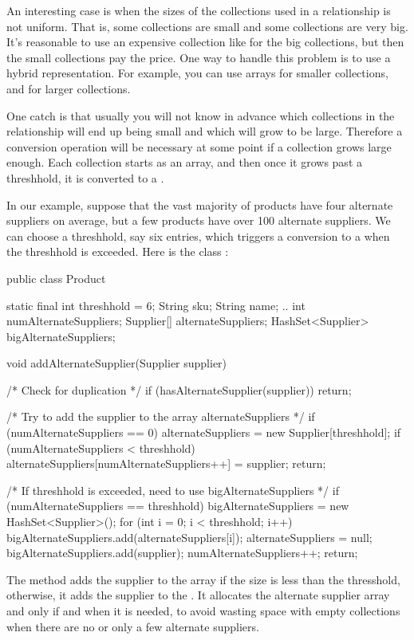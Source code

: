 An interesting case is when the sizes of the collections used in a relationship
is not uniform. That is, some collections are small and some collections are
very big.  It's reasonable to use an expensive collection like 
for the big collections, but then the small collections pay the price. One way
to handle this problem is to use a hybrid representation. For example, you can
use arrays for smaller collections, and  for larger
collections. 

One catch is that usually you will not know in advance which collections in the
relationship will end up being small and which will grow to be large. Therefore
a conversion operation will be necessary at some point if a collection grows
large enough. Each collection starts as an array, and then once it
grows past a threshhold, it is converted to a .

In our example, suppose that the vast majority of products have four alternate
suppliers on average, but a few products have over 100 alternate suppliers. We
can choose a threshhold, say six entries, which triggers a conversion to a
 when the threshhold is exceeded. Here is the class
:

\begin{shortlisting} 
public class Product {

	    static final int threshhold = 6;
		String sku;
		String name;
		..
		int numAlternateSuppliers;
		Supplier[] alternateSuppliers;
		HashSet<Supplier> bigAlternateSuppliers;
		
		void addAlternateSupplier(Supplier supplier) {
		
		    /* Check for duplication */
		    if (hasAlternateSupplier(supplier)) {
		         return;
		    }
		
		    /* Try to add the supplier to the array alternateSuppliers */
		    if (numAlternateSuppliers == 0) {
		        alternateSuppliers = new Supplier[threshhold];
		    }
			if (numAlternateSuppliers < threshhold) {
			    alternateSuppliers[numAlternateSuppliers++] = supplier;
			    return;
			}
			
			/* If threshhold is exceeded, need to use bigAlternateSuppliers */
			if (numAlternateSuppliers == threshhold) {
			    bigAlternateSuppliers = new HashSet<Supplier>();
			    for (int i = 0; i < threshhold; i++) {
			    	bigAlternateSuppliers.add(alternateSuppliers[i]);
			    }
			    alternateSuppliers = null;
			}
			bigAlternateSuppliers.add(supplier);
			numAlternateSuppliers++;
			return;
		}
}
\end{shortlisting}
The method  adds the supplier to the array if the
size is less than the thresshold, otherwise, it adds the supplier to the .
It allocates the alternate supplier array and  
only if and when it is needed, to avoid wasting space with empty collections
when there are no or only a few alternate suppliers.

